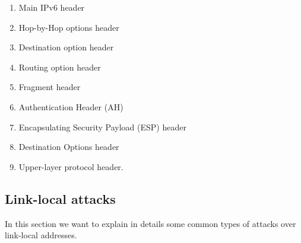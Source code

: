 \documentclass[11pt]{article}
\begin{document}
\begin{enumerate}
\item Main IPv6 header
\item Hop-by-Hop options header
\item Destination option header
\item Routing option header
\item Fragment header
\item Authentication Header (AH)
\item Encapsulating Security Payload (ESP) header
\item Destination Options header
\item Upper-layer protocol header.
\end{enumerate}
\subsection{Link-local attacks}
In this section we want to explain in details some common types of attacks over link-local addresses.
\end{document}
